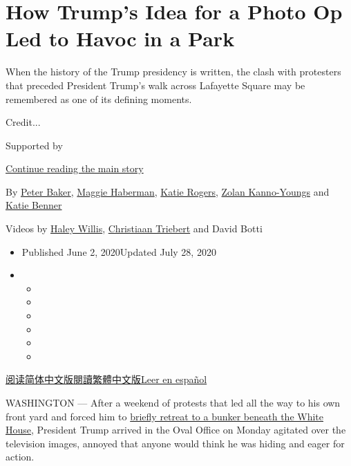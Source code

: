 \hypertarget{how-trumps-idea-for-a-photo-op-led-to-havoc-in-a-park}{%
\section{How Trump's Idea for a Photo Op Led to Havoc in a
Park}\label{how-trumps-idea-for-a-photo-op-led-to-havoc-in-a-park}}

When the history of the Trump presidency is written, the clash with
protesters that preceded President Trump's walk across Lafayette Square
may be remembered as one of its defining moments.

Credit...

Supported by

\protect\hyperlink{after-sponsor}{Continue reading the main story}

By \href{https://www.nytimes3xbfgragh.onion/by/peter-baker}{Peter
Baker},
\href{https://www.nytimes3xbfgragh.onion/by/maggie-haberman}{Maggie
Haberman},
\href{https://www.nytimes3xbfgragh.onion/by/katie-rogers}{Katie Rogers},
\href{https://www.nytimes3xbfgragh.onion/by/zolan-kanno-youngs}{Zolan
Kanno-Youngs} and
\href{https://www.nytimes3xbfgragh.onion/by/katie-benner}{Katie Benner}

Videos by
\href{https://www.nytimes3xbfgragh.onion/by/haley-willis}{Haley Willis},
\href{http://nytimes3xbfgragh.onion/by/christiaan-triebert}{Christiaan
Triebert} and David Botti

\begin{itemize}
\item
  Published June 2, 2020Updated July 28, 2020
\item
  \begin{itemize}
  \item
  \item
  \item
  \item
  \item
  \item
  \end{itemize}
\end{itemize}

\href{https://cn.nytimes3xbfgragh.onion/usa/20200603/trump-walk-lafayette-square/}{阅读简体中文版}\href{https://cn.nytimes3xbfgragh.onion/usa/20200603/trump-walk-lafayette-square/zh-hant/}{閱讀繁體中文版}\href{https://www.nytimes3xbfgragh.onion/es/2020/06/03/espanol/mundo/trump-foto-iglesia-protestas.html}{Leer
en español}

WASHINGTON --- After a weekend of protests that led all the way to his
own front yard and forced him to
\href{https://www.nytimes3xbfgragh.onion/2020/06/03/us/politics/trump-protests.html}{briefly
retreat to a bunker beneath the White House}, President Trump arrived in
the Oval Office on Monday agitated over the television images, annoyed
that anyone would think he was hiding and eager for action.

